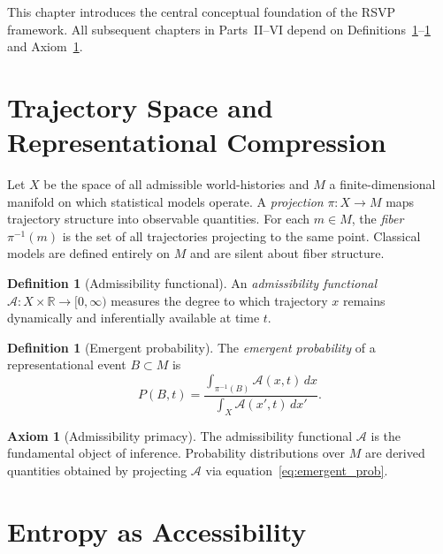 \documentclass[11pt, openright, twoside]{book}
\theoremstyle{plain}
\theoremstyle{definition}
\newtheorem{definition}[theorem]{Definition}
\newtheorem{axiom}[theorem]{Axiom}
\theoremstyle{remark}
\newcommand{\Admiss}{\mathcal{A}}
\newcommand{\Traj}{X}
\newcommand{\Rep}{M}
\newcommand{\proj}{\pi}
\begin{document}
\begin{depbox}
This chapter introduces the central conceptual foundation of the RSVP framework. All
subsequent chapters in Parts~II--VI depend on Definitions~\ref{def:admissibility}--\ref{def:emergent_prob}
and Axiom~\ref{axiom:admissibility_primacy}.
\end{depbox}

\section{Trajectory Space and Representational Compression}

Let $\Traj$ be the space of all admissible world-histories and $\Rep$ a finite-dimensional
manifold on which statistical models operate. A \emph{projection} $\proj:\Traj\to\Rep$ maps
trajectory structure into observable quantities. For each $m\in\Rep$, the \emph{fiber}
$\proj^{-1}(m)$ is the set of all trajectories projecting to the same point. Classical
models are defined entirely on $\Rep$ and are silent about fiber structure.

\begin{definition}[Admissibility functional]
\label{def:admissibility}
An \emph{admissibility functional} $\Admiss:\Traj\times\mathbb{R}\to[0,\infty)$ measures
the degree to which trajectory $x$ remains dynamically and inferentially available at time $t$.
\end{definition}

\begin{definition}[Emergent probability]
\label{def:emergent_prob}
The \emph{emergent probability} of a representational event $B\subset\Rep$ is
\begin{equation}
  P(B,t) = \frac{\int_{\proj^{-1}(B)}\Admiss(x,t)\,dx}{\int_\Traj\Admiss(x',t)\,dx'}.
  \label{eq:emergent_prob}
\end{equation}
\end{definition}

\begin{axiom}[Admissibility primacy]
\label{axiom:admissibility_primacy}
The admissibility functional $\Admiss$ is the fundamental object of inference. Probability
distributions over $\Rep$ are derived quantities obtained by projecting $\Admiss$ via
equation~\eqref{eq:emergent_prob}.
\end{axiom}

\section{Entropy as Accessibility}
\end{document}
